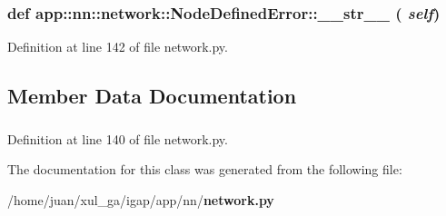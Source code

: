 \subsubsection{\setlength{\rightskip}{0pt plus 5cm}def app::nn::network::NodeDefinedError::\_\-\_\-str\_\-\_\- ( {\em self})}\label{classapp_1_1nn_1_1network_1_1NodeDefinedError_5de806ebe1095f6caf1d036e5c262e3c}




Definition at line 142 of file network.py.

\subsection{Member Data Documentation}
\subsubsection{}\label{classapp_1_1nn_1_1network_1_1NodeDefinedError_8cb8726ea5b1d8ca4908ff83840a190e}




Definition at line 140 of file network.py.

The documentation for this class was generated from the following file:\begin{CompactItemize}
\item 
/home/juan/xul\_\-ga/igap/app/nn/{\bf network.py}\end{CompactItemize}
